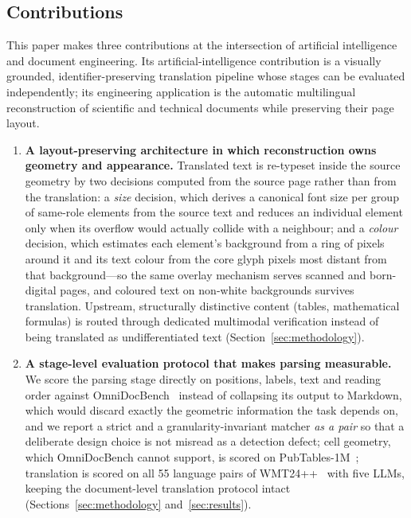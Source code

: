 \subsection{Contributions}

This paper makes three contributions at the intersection of artificial
intelligence and document engineering. Its artificial-intelligence contribution
is a visually grounded, identifier-preserving translation pipeline whose stages
can be evaluated independently; its engineering application is the automatic
multilingual reconstruction of scientific and technical documents while
preserving their page layout.

\begin{enumerate}[leftmargin=1.4em]
  \item \textbf{A layout-preserving architecture in which reconstruction owns
  geometry and appearance.} Translated text is re-typeset inside the source
  geometry by two decisions computed from the source page rather than from the
  translation: a \emph{size} decision, which derives a canonical font size per
  group of same-role elements from the source text and reduces an individual
  element only when its overflow would actually collide with a neighbour; and a
  \emph{colour} decision, which estimates each element's background from a ring
  of pixels around it and its text colour from the core glyph pixels most
  distant from that background---so the same overlay mechanism serves scanned
  and born-digital pages, and coloured text on non-white backgrounds survives
  translation. Upstream, structurally distinctive content (tables,
  mathematical formulas) is routed through dedicated multimodal verification
  instead of being translated as undifferentiated text
  (Section~\ref{sec:methodology}).

  \item \textbf{A stage-level evaluation protocol that makes parsing
  measurable.} We score the parsing stage directly on positions, labels, text
  and reading order against OmniDocBench~\citep{omnidocbench} instead of
  collapsing its output to Markdown, which would discard exactly the geometric
  information the task depends on, and we report a strict and a
  granularity-invariant matcher \emph{as a pair} so that a deliberate design
  choice is not misread as a detection defect; cell geometry, which OmniDocBench
  cannot support, is scored on PubTables-1M~\citep{pubtables1m}; translation is
  scored on all 55
  language pairs of WMT24++~\citep{wmt24pp} with five LLMs, keeping the
  document-level translation protocol intact
  (Sections~\ref{sec:methodology} and~\ref{sec:results}).


\end{enumerate}
